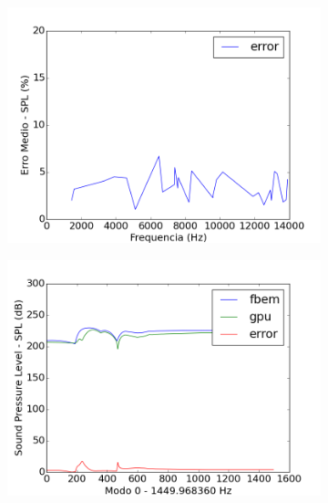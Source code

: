 \begin{figure}[ht]
\centering
\begin{subfigure}{0.6\textwidth}
	\centering
	\includegraphics[width=\textwidth]{../data/transfer_test/ceramic_mug/plots/ceramic_mug_error.png}
	\label{fig:coef_mug_err}
\end{subfigure}
\begin{subfigure}{0.5\textwidth}
	\centering
	\includegraphics[width=\textwidth]{../data/transfer_test/ceramic_mug/plots/ceramic_mug-tfv-0_0.png}
	\label{fig:coef_mug_0}
\end{subfigure}%
\begin{subfigure}{0.5\textwidth}
	\centering

\end{subfigure}
\end{figure}
